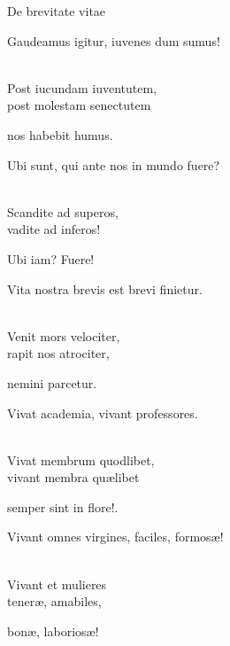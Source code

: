 \begin{song}{De brevitate vitae}
	
	
	

    \showversenumber	
	\begin{repetition}
		Gaudeamus igitur, iuvenes dum sumus!
	\end{repetition}\\
	Post iucundam iuventutem,\\
	post molestam senectutem\\
	\begin{repetition}
		nos habebit humus.
	\end{repetition}
	
    \showversenumber
	\begin{repetition}
		Ubi sunt, qui ante nos in mundo fuere?
	\end{repetition}\\
	Scandite ad superos,\\
	vadite ad inferos!\\
	\begin{repetition}
		Ubi iam? Fuere!
	\end{repetition}
	
    \showversenumber
	\begin{repetition}
		Vita nostra brevis est brevi finietur.
	\end{repetition}\\
	Venit mors velociter,\\
	rapit nos atrociter,\\
	\begin{repetition}
		nemini parcetur.
	\end{repetition}
	
    \showversenumber
	\begin{repetition}
		Vivat academia, vivant professores.
	\end{repetition}\\
	Vivat membrum quodlibet,\\
	vivant membra quælibet\\
	\begin{repetition}
		semper sint in flore!.
	\end{repetition}
	
    \showversenumber
	\begin{repetition}
		Vivant omnes virgines, faciles, formosæ!
	\end{repetition}\\
	Vivant et mulieres\\
	teneræ, amabiles,\\
	\begin{repetition}
		bonæ, laboriosæ!
	\end{repetition}
	

\end{song}
